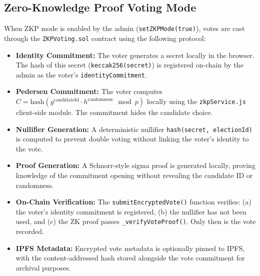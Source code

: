\documentclass[oneside,a4paper,12pt]{book}
\begin{document}
\subsection{Zero-Knowledge Proof Voting Mode}
When ZKP mode is enabled by the admin (\texttt{setZKPMode(true)}), votes are cast through the \texttt{ZKPVoting.sol} contract using the following protocol:
\begin{itemize}[leftmargin=1.5cm]
    \item \textbf{Identity Commitment:} The voter generates a secret locally in the browser. The hash of this secret (\texttt{keccak256(secret)}) is registered on-chain by the admin as the voter's \texttt{identityCommitment}.

    \item \textbf{Pedersen Commitment:} The voter computes $C = \text{hash}(g^{\text{candidateId}} \cdot h^{\text{randomness}} \mod p)$ locally using the \texttt{zkpService.js} client-side module. The commitment hides the candidate choice.

    \item \textbf{Nullifier Generation:} A deterministic nullifier \texttt{hash(secret, electionId)} is computed to prevent double voting without linking the voter's identity to the vote.

    \item \textbf{Proof Generation:} A Schnorr-style sigma proof is generated locally, proving knowledge of the commitment opening without revealing the candidate ID or randomness.

    \item \textbf{On-Chain Verification:} The \texttt{submitEncryptedVote()} function verifies: (a) the voter's identity commitment is registered, (b) the nullifier has not been used, and (c) the ZK proof passes \texttt{\_verifyVoteProof()}. Only then is the vote recorded.

    \item \textbf{IPFS Metadata:} Encrypted vote metadata is optionally pinned to IPFS, with the content-addressed hash stored alongside the vote commitment for archival purposes.
\end{itemize}
\end{document}
